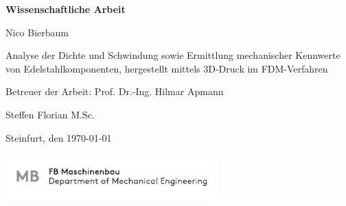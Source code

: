 \begin{minipage}[t]{11cm}
\vspace{2cm}					
\begin{Huge}
\begin{center}\textsf{\textbf{Wissenschaftliche Arbeit}}\end{center}
\end{Huge}


\vspace{2cm} 								
\begin{Large}
\hfill 
\begin{center}

\begin{large}
	Nico Bierbaum
\end{large}

\vspace{2cm} %
\begin{flushright}
	\hfill{Analyse der Dichte und Schwindung sowie Ermittlung mechanischer Kennwerte von Edelstahlkomponenten, hergestellt mittels 3D-Druck im FDM-Verfahren}\\
\end{flushright}			
\end{center}	
\end{Large}

\begin{large}
\vspace{30mm}  %
\hfill Betreuer der Arbeit: Prof. Dr.-Ing. Hilmar Apmann

\hfill Steffen Florian M.Sc.\\
\end{large}

\vspace{35mm}
\hfill Steinfurt, den \today
\end{minipage}
\vspace{20mm}

\begin{minipage}[t]{136.5mm}
\begin{flushright}
\includegraphics[width=82mm]{bilder/MB_CMYK.pdf}
\end{flushright}
\end{minipage}
\restoregeometry
